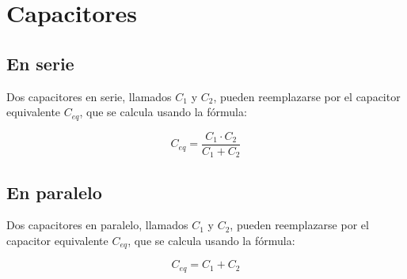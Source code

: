 \documentclass[../principal.tex]{subfiles}
\begin{document}

\section{Capacitores}

\subsection{En serie}

Dos capacitores en serie, llamados $C_1$ y $C_2$, pueden reemplazarse por el capacitor equivalente $C_{eq}$, que se calcula usando la fórmula:

\begin{equation}
C_{eq} = \frac{C_1 \cdot C_2}{C_1 + C_2}
\end{equation}


\subsection{En paralelo}

Dos capacitores en paralelo, llamados $C_1$ y $C_2$, pueden reemplazarse por el capacitor equivalente $C_{eq}$, que se calcula usando la fórmula:


\begin{equation}
C_{eq} = C_1 + C_2
\end{equation}

\newpage
\end{document}

